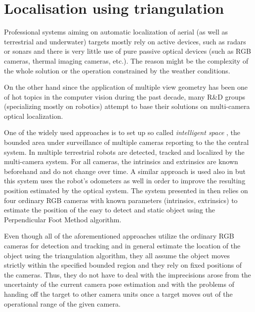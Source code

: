 \section{Localisation using triangulation}


Professional systems aiming on automatic localization of aerial (as well as terrestrial and underwater) targets mostly rely on active devices, such as radars or sonars and there is very little use of pure passive optical devices (such as RGB cameras, thermal imaging cameras, etc.). The reason might be the complexity of the whole solution or the operation constrained by the weather conditions.

On the other hand since the application of multiple view geometry has been one of hot topics in the computer vision during the past decade, many R\&D groups (specializing mostly on robotics) attempt to base their solutions on multi-camera optical localization.

One of the widely used approaches is to set up so called \textit{intelligent space} \cite{intelligentSpace}, the bounded area under surveillance of multiple cameras reporting to the the central system. In \cite{Multi-Camera_Sensor_System_for_3D_Segmentation} multiple terrestrial robots are detected, tracked and localized by the multi-camera system. For all cameras, the intrinsics and extrinsics are known beforehand and do not change over time.  A similar approach is used also in \cite{Localization_and_Geometric_Reconstruction_of_Mobile_Robots} but this system uses the robot's odometers as well in order to improve the resulting position estimated by the optical system. The system presented in \cite{A_3D_visual_localization} then relies on four ordinary RGB cameras with known parameters (intrinsics, extrinsics) to estimate the position of the easy to detect and static object using the Perpendicular Foot Method algorithm.

Even though all of the aforementioned approaches utilize the ordinary RGB cameras for detection and tracking and in general estimate the location of the object using the triangulation algorithm, they all assume the object moves strictly within the specified bounded region and they rely on fixed positions of the cameras. Thus, they do not have to deal with the imprecisions arose from the uncertainty of the current camera pose estimation and with the problems of handing off the target to other camera units once a target moves out of the operational range of the given camera. 

